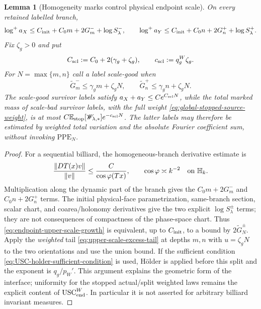 \documentclass[11pt]{article}
\newtheorem{lemma}[theorem]{Lemma}
\begin{document}
\begin{lemma}[Homogeneity marks control physical endpoint scale]
\label{lem:endpoint-upper-scale}
On every retained labelled branch,
\begin{equation}
\label{eq:endpoint-upper-scale-growth}
 \log^+a_X\le C_{\rm init}+C_0m+2G_m^-+\log S_\lambda^-,
 \qquad
 \log^+a_Y\le C_{\rm init}+C_0n+2G_n^++\log S_\lambda^+.
\end{equation}
Fix $\zeta_g>0$ and put
\begin{equation}
\label{eq:scale-good-constants}
 C_{\rm scl}:=C_0+2(\gamma_g+\zeta_g),\qquad
 c_{\rm scl}:=q_g^W\zeta_g.
\end{equation}
For $N=\max\{m,n\}$ call a label scale-good when
\begin{equation}
\label{eq:weighted-scale-good-event}
 \widetilde G_m^-\le\gamma_gm+\zeta_gN,
 \qquad
 \widetilde G_n^+\le\gamma_gn+\zeta_gN.
\end{equation}
The scale-good survivor labels satisfy
$a_X+a_Y\le Ce^{C_{\rm scl}N}$, while the total marked mass of scale-bad
survivor labels, with the full weight \eqref{eq:global-stopped-source-weight}, is at most
$C\mathbb E_{\rm stop}[\mathscr W_{\lambda,*}]e^{-c_{\rm scl}N}$.  The latter
labels may therefore be estimated by weighted total variation and the
absolute Fourier coefficient sum, without invoking $\mathrm{PPE}_{N}$.
\end{lemma}

\begin{proof}
For a sequential billiard, the homogeneous-branch derivative estimate is
\cite{DLcones}
\[
 \frac{\|DT(x)v\|}{\|v\|}\le\frac{C}{\cos\varphi(Tx)},
 \qquad \cos\varphi\asymp k^{-2}\quad\hbox{on }\mathbb H_k.
\]
Multiplication along the dynamic part of the branch gives the $C_0m+2G_m^-$
and $C_0n+2G_n^+$ terms.  The initial physical-face parametrization,
same-branch section, scalar chart, and coarea/holonomy derivatives give the
two explicit $\log S_\lambda^\pm$ terms; they are not consequences of
compactness of the phase-space chart.  Thus
\eqref{eq:endpoint-upper-scale-growth} is equivalent, up to
$C_{\rm init}$, to a bound by $2\widetilde G_N^\pm$.  Apply the
\emph{weighted} tail \eqref{eq:upper-scale-excess-tail} at depths $m,n$ with
$u=\zeta_gN$ to the two orientations and use the union bound.  If the
sufficient condition \eqref{eq:USC-holder-sufficient-condition} is used,
H\"older is applied before this split and the exponent is $q_g/p_W'$.  This
argument explains the geometric form of the interface; uniformity for the
stopped actual/split weighted laws remains the explicit content of
$\mathrm{USC}_{\rm end}^{W}$.  In particular it is not asserted for
arbitrary billiard invariant measures.
\end{proof}
\end{document}
